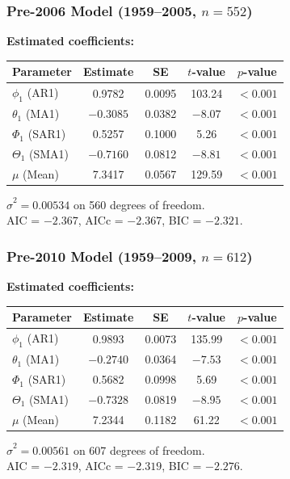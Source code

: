 \documentclass[10pt,twocolumn,letterpaper]{article}
\begin{document}
\subsubsection{Pre-2006 Model (1959--2005, $n=552$)}

\textbf{Estimated coefficients:}
\begin{table}[h]
\centering
\begin{tabular}{lcccc}
\hline
Parameter & Estimate & SE & $t$-value & $p$-value \\
\hline
$\phi_1$ (AR1) & 0.9782 & 0.0095 & 103.24 & $<0.001$ \\
$\theta_1$ (MA1) & $-0.3085$ & 0.0382 & $-8.07$ & $<0.001$ \\
$\Phi_1$ (SAR1) & 0.5257 & 0.1000 & 5.26 & $<0.001$ \\
$\Theta_1$ (SMA1) & $-0.7160$ & 0.0812 & $-8.81$ & $<0.001$ \\
$\mu$ (Mean) & 7.3417 & 0.0567 & 129.59 & $<0.001$ \\
\hline
\end{tabular}
\end{table}

\noindent
$\hat{\sigma}^2 = 0.00534$ on 560 degrees of freedom. \\
AIC = $-2.367$, AICc = $-2.367$, BIC = $-2.321$.

\subsubsection{Pre-2010 Model (1959--2009, $n=612$)}

\textbf{Estimated coefficients:}
\begin{table}[h]
\centering
\begin{tabular}{lcccc}
\hline
Parameter & Estimate & SE & $t$-value & $p$-value \\
\hline
$\phi_1$ (AR1) & 0.9893 & 0.0073 & 135.99 & $<0.001$ \\
$\theta_1$ (MA1) & $-0.2740$ & 0.0364 & $-7.53$ & $<0.001$ \\
$\Phi_1$ (SAR1) & 0.5682 & 0.0998 & 5.69 & $<0.001$ \\
$\Theta_1$ (SMA1) & $-0.7328$ & 0.0819 & $-8.95$ & $<0.001$ \\
$\mu$ (Mean) & 7.2344 & 0.1182 & 61.22 & $<0.001$ \\
\hline
\end{tabular}
\end{table}

\noindent
$\hat{\sigma}^2 = 0.00561$ on 607 degrees of freedom. \\
AIC = $-2.319$, AICc = $-2.319$, BIC = $-2.276$.
\end{document}

